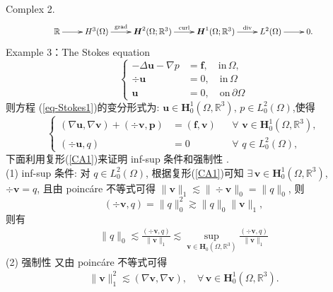 Complex 2.
\begin{equation}\label{CA1}
	\resizebox{0.8\hsize}{!}{$
		\begin{array}{c}
			\xymatrix{	
\mathbb{R} \ar[r] & H^{3}(\Omega)\ar[r]^-{\grad} & \boldsymbol{H}^{2}(\Omega;\mathbb{R}^{3})  \ar[r]^-{\curl}
				& \boldsymbol{H}^{1}(\Omega;\mathbb{R}^{3})    \ar[r]^-{\div} & L^2(\Omega) \ar[r]^{} & 0 .
 }
		\end{array}
		$}
	\end{equation}
Example 3：The Stokes equation
\begin{equation}\label{eq-Stokes1}
\left\{
\begin{aligned}
-\Delta \boldsymbol{u} - \nabla p &=\boldsymbol{f},\quad \mathrm{in}\,\Omega,\\
\div \boldsymbol{u}&=0, \quad \mathrm{in}\,\Omega\\
\boldsymbol{u}&=0,\quad \mathrm{on}\,\partial\Omega
\end{aligned}
\right.
\end{equation}
则方程 (\ref{eq-Stokes1})的变分形式为: $\boldsymbol{u}\in\boldsymbol{H}_{0}^1(\Omega,\mathbb{R}^{3}),\,p\in L_0^{2}(\Omega)$,使得
\begin{equation}\label{Cq1}
\left\{
\begin{aligned}
(\nabla\boldsymbol{u},\nabla\boldsymbol{v})+(\div\boldsymbol{v},\boldsymbol{p})&=(\boldsymbol{f},\boldsymbol{v})
  &&\forall \,\, \boldsymbol{v}\in \boldsymbol{H}_{0}^1(\Omega,\mathbb{R}^{3}),
 \\
 ( \div\boldsymbol{u},q) &=0 &&\forall \,\, q\in L_0^{2}(\Omega),
\end{aligned}\right.
\end{equation}
下面利用复形(\ref{CA1})来证明 inf-sup 条件和强制性 .\\
(1) inf-sup 条件: 对 $q\in   L_0^{2}(\Omega)$, 根据复形(\ref{CA1})可知 $ \exists\,\boldsymbol{v}\in \boldsymbol{H}_{0}^1(\Omega,\mathbb{R}^{3})$,
$\div \boldsymbol{v}=q$, 且由 poinc\'{a}re 不等式可得 $ \|\boldsymbol{v}\|_{1}\lesssim\|\div\boldsymbol{v}\|_{0}=\|q\|_{0}$, 则
$$(\div \boldsymbol{v},q)=\|q\|_{0}^2\gtrsim\|q\|_{0}\|\boldsymbol{v}\|_{1},$$
则有
\begin{align*}
\|q\|_{0}\lesssim\frac{(\div \boldsymbol{v},q)}{\|\boldsymbol{v}\|_{1}}\lesssim\sup_{\boldsymbol{v}\in\boldsymbol{H}_0(\Omega,\mathbb{R}^{3})}\frac{(\div \boldsymbol{v},q)}{\|\boldsymbol{v}\|_{1}}
\end{align*}
(2) 强制性
又由 poinc\'{a}re 不等式可得
\begin{align*}
\|\boldsymbol{v}\|_{1}^2
\lesssim(\nabla\boldsymbol{v},\nabla\boldsymbol{v}),\quad\forall \,\boldsymbol{v}\in \boldsymbol{H}_{0}^1(\Omega,\mathbb{R}^{3}).
\end{align*}

